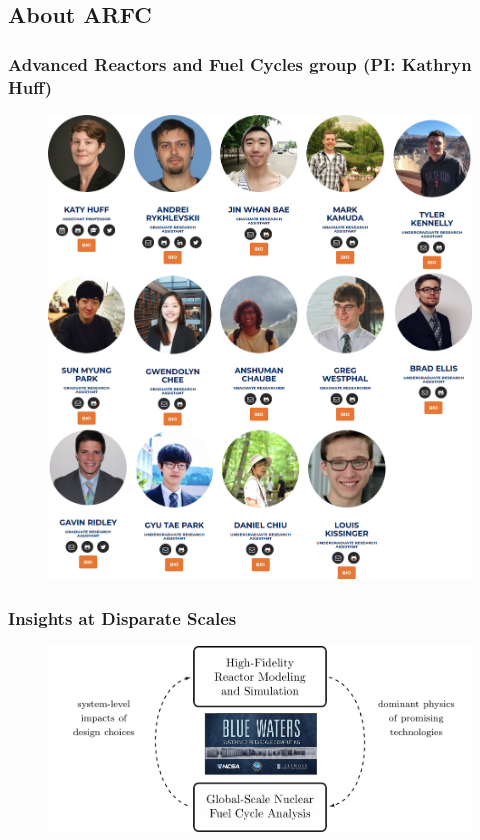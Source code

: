 \subsection{About ARFC}
\begin{frame}
  \frametitle{Advanced Reactors and Fuel Cycles group (PI: Kathryn Huff)}
               \begin{figure}[t]
                \vspace*{-0.1in}
                \includegraphics[height=0.71\textwidth]{./images/arfc1.png}
               \end{figure}            
\end{frame}

\begin{frame}
  \frametitle{Insights at Disparate Scales}
               \begin{figure}[t]
                \vspace*{-0.1in}
			\hspace*{-0.35in}
                \includegraphics[height=0.5\textwidth]{./images/synergy.png}
               \end{figure}            
\end{frame}

